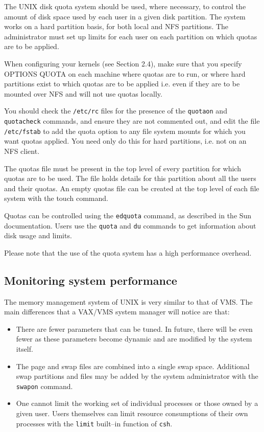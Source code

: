 The UNIX disk quota system should be used, where necessary, to control the
amount of disk space used by each user in a given disk partition. The system
works on a hard partition basis, for both local and NFS partitions. The
administrator must set up limits for each user on each partition on which
quotas are to be applied.

When configuring your kernels (see Section 2.4), make sure that you specify
OPTIONS QUOTA on each machine where quotas are to run, or where hard partitions
exist to which quotas are to be applied i.e. even if they are to be mounted
over NFS and will not use quotas locally.

You should check the {\tt /etc/rc} files for the presence of the {\tt quotaon} and
{\tt quotacheck} commands, and ensure they are not commented out, and
edit the file {\tt /etc/fstab} to add the quota option to any file system mounts
for which you want quotas applied. You need  only do this for hard partitions,
i.e. not on an NFS client.

The quotas file must be present in the top level of every partition for which
quotas are to be used. The file holds details for this partition about all the
users and their quotas. An empty quotas file can be created at the top level
of each file system with the touch command.

Quotas can be controlled using the {\tt edquota} command, as described in the Sun
documentation. Users use the {\tt quota} and {\tt du} commands to get information
about disk usage and limits.

Please note that the use of the quota system has a high performance overhead.

\subsection{Monitoring system performance}

The memory management system of UNIX is very similar to that of VMS. The main
differences that a VAX/VMS system manager will notice are that:

\begin{itemize}

\item There are fewer parameters that can be tuned. In future, there will be
even fewer as these parameters become dynamic and are modified by the system
itself.

\item The page and swap files are combined into a single swap space. Additional
swap partitions and files may be added by the system administrator with the
{\tt swapon} command.

\item One cannot limit the working set of individual processes or those owned
by a given user. Users themselves can limit resource consumptions of their
own processes with the {\tt limit} built--in function of {\tt csh}.

\end {itemize}

